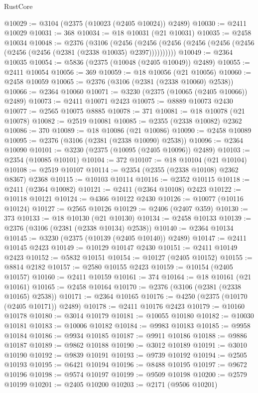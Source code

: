 \begin{lexlean}{RustCore}
\begin{coremodule}
@10029 := @3104 (@2375 (@10023 (@2405 @10024)) @2489)
@10030 := @2411 @10029
@10031 := 368
@10034 := @18 @10031 (@21 @10031)
@10035 := @2458 @10034
@10048 := @2376
    (@3106
      (@2456 (@2456 (@2456 (@2456 (@2456 (@2456 (@2456 (@2456 (@2381 (@2338 @10035) @2397))))))))))
@10049 := @2364 @10035
@10054 := @5836 (@2375 (@10048 (@2405 @10049)) @2489)
@10055 := @2411 @10054
@10056 := 369
@10059 := @18 @10056 (@21 @10056)
@10060 := @2458 @10059
@10065 := @2376 (@3106 (@2381 (@2338 @10060) @2538))
@10066 := @2364 @10060
@10071 := @3230 (@2375 (@10065 (@2405 @10066)) @2489)
@10073 := @2411 @10071 @2423
@10075 := @8889 @10073 @2430
@10077 := @2565 @10075 @8885
@10078 := 371
@10081 := @18 @10078 (@21 @10078)
@10082 := @2519 @10081
@10085 := @2355 (@2338 @10082) @2362
@10086 := 370
@10089 := @18 @10086 (@21 @10086)
@10090 := @2458 @10089
@10095 := @2376 (@3106 (@2381 (@2338 @10090) @2538))
@10096 := @2364 @10090
@10101 := @3230 (@2375 (@10095 (@2405 @10096)) @2489)
@10103 := @2354 (@10085 @10101)
@10104 := 372
@10107 := @18 @10104 (@21 @10104)
@10108 := @2519 @10107
@10114 := @2354 (@2355 (@2338 @10108) @2362 @8367) @2368
@10115 := @10103 @10114
@10116 := @2352 @10115
@10118 := @2411 (@2364 @10082)
@10121 := @2411 (@2364 @10108) @2423
@10122 := @10118 @10121
@10124 := @4366 @10122 @2430
@10126 := @10077 (@10116 @10124)
@10127 := @2565 @10126
@10129 := @2406 (@2407 @359)
@10130 := 373
@10133 := @18 @10130 (@21 @10130)
@10134 := @2458 @10133
@10139 := @2376 (@3106 (@2381 (@2338 @10134) @2538))
@10140 := @2364 @10134
@10145 := @3230 (@2375 (@10139 (@2405 @10140)) @2489)
@10147 := @2411 @10145 @2423
@10149 := @10129 @10147 @2430
@10151 := @2411 @10149 @2423
@10152 := @5832 @10151
@10154 := @10127 (@2405 @10152)
@10155 := @8814 @2182
@10157 := @2580 @10155 @2423
@10159 := @10154 (@2405 @10157)
@10160 := @2411 @10159
@10161 := 374
@10164 := @18 @10161 (@21 @10161)
@10165 := @2458 @10164
@10170 := @2376 (@3106 (@2381 (@2338 @10165) @2538))
@10171 := @2364 @10165
@10176 := @4250 (@2375 (@10170 (@2405 @10171)) @2489)
@10178 := @2411 @10176 @2423
@10179 := @10160 @10178
@10180 := @3014 @10179
@10181 := @10055 @10180
@10182 := @10030 @10181
@10183 := @10006 @10182
@10184 := @9983 @10183
@10185 := @9958 @10184
@10186 := @9934 @10185
@10187 := @9911 @10186
@10188 := @9886 @10187
@10189 := @9862 @10188
@10190 := @3012 @10189
@10191 := @3010 @10190
@10192 := @9839 @10191
@10193 := @9739 @10192
@10194 := @2505 @10193
@10195 := @6421 @10194
@10196 := @8488 @10195
@10197 := @9672 @10196
@10198 := @9574 @10197
@10199 := @9509 @10198
@10200 := @2579 @10199
@10201 := @2405 @10200
@10203 := @2171 (@9506 @10201)

\end{coremodule}
\end{lexlean}
